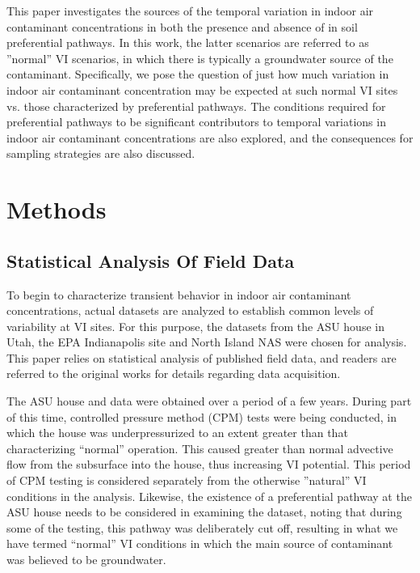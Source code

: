 \documentclass[journal=esthag,manuscript=article]{achemso}
\begin{document}
This paper investigates the sources of the temporal variation in indoor air contaminant concentrations in both the presence and absence of in soil preferential pathways.
In this work, the latter scenarios are referred to as ”normal” VI scenarios, in which there is typically a groundwater source of the contaminant.
Specifically, we pose the question of just how much variation in indoor air contaminant concentration may be expected at  such normal  VI  sites vs. those characterized by preferential pathways.
The conditions required for preferential pathways to be significant contributors to temporal variations in indoor air contaminant concentrations are also explored, and the consequences for sampling strategies are also discussed.

\section{Methods}

\subsection{Statistical Analysis Of Field Data}

To begin to characterize transient behavior in indoor air contaminant concentrations, actual datasets are analyzed to establish common levels of variability at VI sites.
For this purpose, the datasets from the ASU house in Utah, the EPA Indianapolis site and North Island NAS were chosen for analysis.
This paper relies on statistical analysis of published field data, and readers are referred to the original works for details regarding data acquisition\cite{holton_evaluation_2015,guo_vapor_2015,holton_temporal_2013,hosangadi_high-frequency_2017,u.s._environmental_protection_agency_assessment_2015}. \par

The ASU house and data were obtained over a period of a few years.
During part of this time, controlled pressure method (CPM) tests were being conducted, in which the house was underpressurized to an extent greater than that characterizing “normal” operation.
This caused greater than normal advective flow from the subsurface into the house, thus increasing VI potential\cite{mchugh_evaluation_2012,mchugh_recent_2017,holton_evaluation_2015}.
This period of CPM testing is considered separately from the otherwise ”natural” VI conditions in the analysis.
Likewise, the existence of a preferential pathway at the ASU house needs to be considered in examining the dataset, noting that during some of the testing, this pathway was deliberately cut off, resulting in what we have termed “normal” VI conditions in which the main source of contaminant was believed to be groundwater. \par
\end{document}
